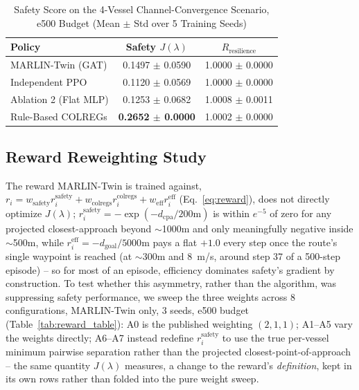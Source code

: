 \documentclass[journal,twocolumn,10pt]{IEEEtran}
\begin{document}
\begin{table}[h]
\caption{Safety Score on the 4-Vessel Channel-Convergence Scenario, e500 Budget (Mean $\pm$ Std over 5 Training Seeds)}
\label{tab:multivessel_table}
\centering
\begin{tabular}{lcc}
\toprule
\textbf{Policy} & \textbf{Safety $J(\lambda)$} & \textbf{$R_{\text{resilience}}$} \\
\midrule
MARLIN-Twin (GAT) & 0.1497 $\pm$ 0.0590 & 1.0000 $\pm$ 0.0000 \\
Independent PPO & 0.1120 $\pm$ 0.0569 & 1.0000 $\pm$ 0.0000 \\
Ablation 2 (Flat MLP) & 0.1253 $\pm$ 0.0682 & 1.0008 $\pm$ 0.0011 \\
Rule-Based COLREGs & \textbf{0.2652 $\pm$ 0.0000} & 1.0002 $\pm$ 0.0000 \\
\bottomrule
\end{tabular}
\end{table}

\subsection{Reward Reweighting Study}
\label{sec:reward-reweighting}
The reward MARLIN-Twin is trained against, $r_i = w_{\text{safety}} r_i^{\text{safety}} + w_{\text{colregs}} r_i^{\text{colregs}} + w_{\text{eff}} r_i^{\text{eff}}$ (Eq.~\ref{eq:reward}), does not directly optimize $J(\lambda)$; $r_i^{\text{safety}} = -\exp(-d_{\text{cpa}}/200\text{m})$ is within $e^{-5}$ of zero for any projected closest-approach beyond $\sim$1000m and only meaningfully negative inside $\sim$500m, while $r_i^{\text{eff}} = -d_{\text{goal}}/5000\text{m}$ pays a flat $+1.0$ every step once the route's single waypoint is reached (at $\sim$300m and 8~m/s, around step 37 of a 500-step episode) -- so for most of an episode, efficiency dominates safety's gradient by construction. To test whether this asymmetry, rather than the algorithm, was suppressing safety performance, we sweep the three weights across 8 configurations, MARLIN-Twin only, 3 seeds, e500 budget (Table~\ref{tab:reward_table}): A0 is the published weighting $(2,1,1)$; A1--A5 vary the weights directly; A6--A7 instead redefine $r_i^{\text{safety}}$ to use the true per-vessel minimum pairwise separation rather than the projected closest-point-of-approach -- the same quantity $J(\lambda)$ measures, a change to the reward's \emph{definition}, kept in its own rows rather than folded into the pure weight sweep.
\end{document}

